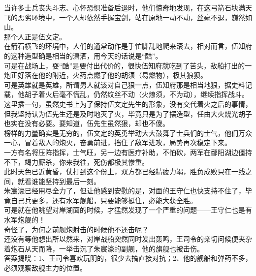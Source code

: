 \begin{multicols}{\theparacolNo}
当许多士兵丧失斗志、心怀恐惧准备后退时，他们惊奇地发现，在这弓箭石块满天飞的恶劣环境中，一个人却依然手握宝剑，站在原地一动不动，丝毫不退，巍然如山。\\

那个人正是伍文定。\\

在箭石横飞的环境中，人们的通常动作是手忙脚乱地爬来滚去，相对而言，伍知府的这种造型确是相当的潇洒，用今天的话说是“酷”。\\

可是在战场上，耍“酷”是要付出代价的，很快伍知府就吃到了苦头，敌船打出的一炮正好落在他的附近，火药点燃了他的胡须（易燃物），极其狼狈。\\

可是英雄就是英雄，所谓男人就该对自己狠一点，伍知府那是相当地狠，据史料记载，他胡子着火后毫不慌乱，仍然纹丝不动（火燎须，不为动），继续指挥战斗。\\

这里插一句，虽然史书上为了保持伍文定先生的形象，没有交代着火之后的事情，但我坚持认为伍先生还是及时地灭了火，毕竟只是为了摆造型，任由大火烧光胡子也实在没有必要。要知道，伍先生虽然狠，却也不傻。\\

榜样的力量确实是无穷的，伍文定的英勇举动大大鼓舞了士兵们的士气，他们万众一心，冒着敌人的炮火，奋勇前进，挡住了敌军进攻，局势再次稳定下来。\\

一方有名将压阵指挥，士气旺，另一边有医疗补助，不怕砍，两军在鄱阳湖边僵持不下，竭力厮杀，你来我往，死伤都极其惨重。\\

此时天色已近黄昏，仗打到这个份上，双方都已经精疲力竭，胜负成败只在一线之间，就看谁能坚持到最后一刻。\\

朱宸濠已经用尽全力了，但让他感到安慰的是，对面的王守仁也快支持不住了，毕竟自己兵更多，还有水军舰船，只要能够挺住，必能大获全胜。\\

可是就在他眺望对岸湖面的时候，才猛然发现了一个严重的问题——王守仁也是有水军炮舰的！\\

奇怪了，为何之前舰炮射击的时候他不还击呢？\\

还没有等他想出所以然来，对岸战船突然同时发出轰鸣，王司令的亲切问候便夹杂着炮石从天而降，一举击沉了朱宸濠的副舰，他的旗舰也被击伤。\\

答案揭晓：1、王司令喜欢玩阴的，很少去搞直接对抗；2、他的舰船和弹药不多，必须观察敌舰主力的位置。\\


\end{multicols}
